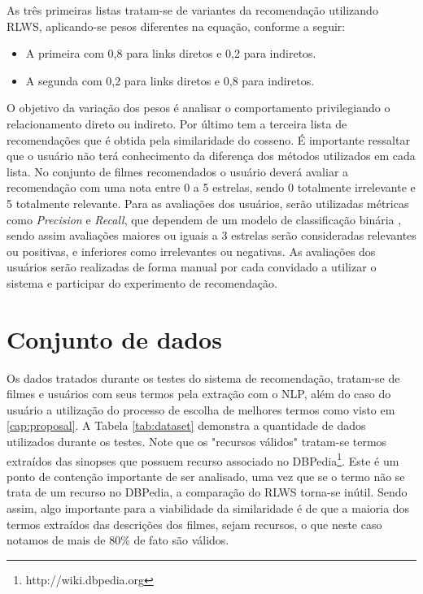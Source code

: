 As três primeiras listas tratam-se de variantes da recomendação utilizando \ac{RLWS}, aplicando-se pesos diferentes na equação, conforme a seguir: 

\begin{itemize}
	\item{A primeira com 0,8 para links diretos e 0,2 para indiretos.}
	\item{A segunda com 0,2 para links diretos e 0,8 para indiretos.}
\end{itemize}

O objetivo da variação dos pesos é analisar o comportamento privilegiando o relacionamento direto ou indireto. Por último tem a terceira lista de recomendações que é obtida pela similaridade do cosseno. É importante ressaltar que o usuário não terá conhecimento da diferença dos métodos utilizados em cada lista. No conjunto de filmes recomendados o usuário deverá avaliar a recomendação com uma nota entre 0 a 5 estrelas, sendo 0 totalmente irrelevante e 5 totalmente relevante. Para as avaliações dos usuários, serão utilizadas métricas como \textit{Precision} e \textit{Recall}, que dependem de um modelo de classificação binária \citep{Powers_2008}, sendo assim avaliações maiores ou iguais a 3 estrelas serão consideradas relevantes ou positivas, e inferiores como irrelevantes ou negativas. As avaliações dos usuários serão realizadas de forma manual por cada convidado a utilizar o sistema e participar do experimento de recomendação.

\section{Conjunto de dados}

Os dados tratados durante os testes do sistema de recomendação, tratam-se de filmes e usuários com seus termos pela extração com o \ac{NLP}, além do caso do usuário a utilização do processo de escolha de melhores termos como visto em \ref{cap:proposal}. A Tabela \ref{tab:dataset} demonstra a quantidade de dados utilizados durante os testes. Note que os "recursos válidos" tratam-se termos extraídos das sinopses que possuem recurso associado no DBPedia\footnote{http://wiki.dbpedia.org}. Este é um ponto de contenção importante de ser analisado, uma vez que se o termo não se trata de um recurso no DBPedia, a comparação do \ac{RLWS} torna-se inútil. Sendo assim, algo importante para a viabilidade da similaridade é de que a maioria dos termos extraídos das descrições dos filmes, sejam recursos, o que neste caso notamos de mais de 80\% de fato são válidos.


